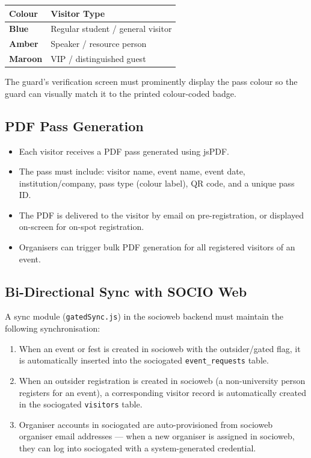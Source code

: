 \documentclass[12pt,a4paper]{article}
\begin{document}
\begin{tabularx}{\textwidth}{L{3cm} X}
\toprule
{}
\textbf{Colour} & \textbf{Visitor Type} \\
\midrule
\textbf{Blue} & Regular student / general visitor \\
\textbf{Amber} & Speaker / resource person \\
\textbf{Maroon} & VIP / distinguished guest \\
\bottomrule
\end{tabularx}

The guard's verification screen must prominently display the pass colour so the guard can visually match it to the printed colour-coded badge.

\subsection{PDF Pass Generation}

\begin{itemize}[leftmargin=*]
    \item Each visitor receives a PDF pass generated using jsPDF.
    \item The pass must include: visitor name, event name, event date, institution/company, pass type (colour label), QR code, and a unique pass ID.
    \item The PDF is delivered to the visitor by email on pre-registration, or displayed on-screen for on-spot registration.
    \item Organisers can trigger bulk PDF generation for all registered visitors of an event.
\end{itemize}

\subsection{Bi-Directional Sync with SOCIO Web}

A sync module (\texttt{gatedSync.js}) in the socioweb backend must maintain the following synchronisation:

\begin{enumerate}[leftmargin=*]
    \item When an event or fest is created in socioweb with the outsider/gated flag, it is automatically inserted into the sociogated \texttt{event\_requests} table.
    \item When an outsider registration is created in socioweb (a non-university person registers for an event), a corresponding visitor record is automatically created in the sociogated \texttt{visitors} table.
    \item Organiser accounts in sociogated are auto-provisioned from socioweb organiser email addresses — when a new organiser is assigned in socioweb, they can log into sociogated with a system-generated credential.
\end{enumerate}
\end{document}
